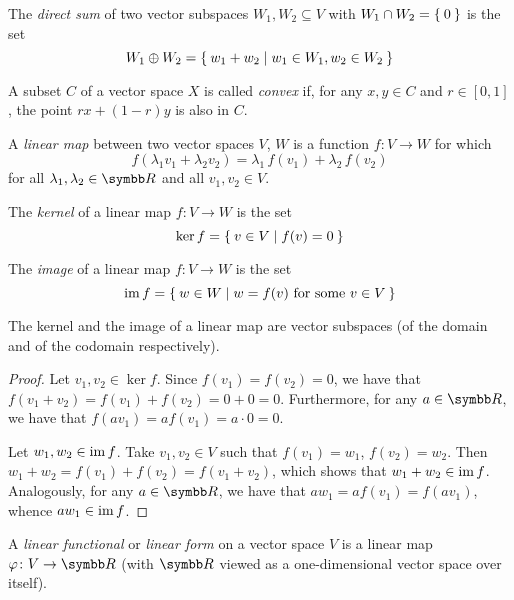\begin{definition}
The \emph{direct sum} of two vector subspaces \(W_1, W_2 \subseteq V\) with \(W_1 \cap W_2 = \Set{ 0 }\) is the set
\[
    W_1 \oplus W_2 = \Set{ w_1 + w_2 | w_1 \in W_1, w_2 \in W_2 }
\]
\end{definition}

\begin{definition}
\label{def:convex_set}

A subset \(C\) of a vector space \(X\) is called \emph{convex} if, for any \(x, y \in C\) and \(r \in [0, 1]\), the point \(r x + (1 - r) y\) is also in \(C\).
\end{definition}

\begin{definition}
A \emph{linear map} between two vector spaces \(V\), \(W\) is a function \(f \colon V \to W\) for which
\[
    f(\lambda_1 v_1 + \lambda_2 v_2) = \lambda_1 \, f(v_1) + \lambda_2 \, f(v_2)
\]
for all \(\lambda_1, \lambda_2 \in \reals\) and all \(v_1, v_2 \in V\).
\end{definition}

\begin{definition}
The \emph{kernel} of a linear map \(f \colon V \to W\) is the set
\[
    \ker f = \Set{ v \in V | f(v) = 0 }
\]
\end{definition}

\begin{definition}
The \emph{image} of a linear map \(f \colon V \to W\) is the set
\[
    \operatorname{im} f = \Set{ w \in W | w = f(v) \text{ for some } v \in V }
\]
\end{definition}

\begin{proposition}
The kernel and the image of a linear map are vector subspaces (of the domain and of the codomain respectively).
\end{proposition}
\begin{proof}
Let \(v_1, v_2 \in \ker f\). Since \(f(v_1) = f(v_2) = 0\), we have that \(f(v_1 + v_2) = f(v_1) + f(v_2) = 0 + 0 = 0\). Furthermore, for any \(a \in \reals\), we have that \(f(a v_1) = a f(v_1) = a \cdot 0 = 0\).

Let \(w_1, w_2 \in \operatorname{im} f\). Take \(v_1, v_2 \in V\) such that \(f(v_1) = w_1\), \(f(v_2) = w_2\). Then \(w_1 + w_2 = f(v_1) + f(v_2) = f(v_1 + v_2)\), which shows that \(w_1 + w_2 \in \operatorname{im} f\). Analogously, for any \(a \in \reals\), we have that \(a w_1 = a f(v_1) = f(a v_1)\), whence \(a w_1 \in \operatorname{im} f\).
\end{proof}

\begin{definition}
A \emph{linear functional} or \emph{linear form} on a vector space \(V\) is a linear map \(\varphi \colon V \to \reals\) (with \(\reals\) viewed as a one-dimensional vector space over itself).
\end{definition}
